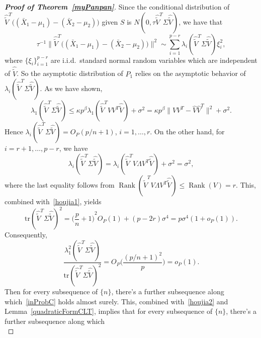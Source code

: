 \documentclass[review]{elsarticle}
\DeclareMathOperator{\myrank}{Rank}
\theoremstyle{plain}
\theoremstyle{definition}
\theoremstyle{remark}
\begin{document}
\begin{proof}[\textbf{Proof of Theorem~\ref{myPanpan}}]
    Since the conditional distribution of
    $\hat{\tilde{V}}^T\big((\bar{X}_1-\mu_1)-(\bar{X}_2-\mu_2)\big)$ given $S$ is $N(0,\tau \hat{\tilde{V}}^T\Sigma\hat{\tilde{V}})$,
    we have that
\begin{equation}\label{houjia2}
\tau^{-1}\big\|\hat{\tilde{V}}^T\big((\bar{X}_1-\mu_1)-(\bar{X}_2-\mu_2)\big)\big\|^2
\sim
    \sum_{i=1}^{p-r} \lambda_i(\hat{\tilde{V}}^T\Sigma\hat{\tilde{V}})\xi_i^2,
\end{equation}
where $\{\xi_i\}_{i=1}^{p-r}$ are i.i.d.\  standard normal random variables which are independent of $\hat{\tilde{V}}$.
    So the asymptotic distribution of $P_1$ relies on the asymptotic behavior of $\lambda_i(\hat{\tilde{V}}^T\Sigma\hat{\tilde{V}})$.
    As we have shown,
     \begin{equation}\label{houjia1}
     \lambda_1(\hat{\tilde{V}}^T\Sigma\hat{\tilde{V}})\leq 
     \kappa p^{\beta}\lambda_1(\hat{\tilde{V}}^T V V^T\hat{\tilde{V}})+\sigma^2
     =
    \kappa p^\beta \|VV^T -\hat{V}\hat{V}^T\|^2+\sigma^2.
     \end{equation}
    Hence $\lambda_i(\hat{\tilde{V}}^T\Sigma\hat{\tilde{V}})=O_P({p}/{n}+1)$, $i=1,\ldots,r$.
    On the other hand,
    for $i=r+1,\ldots,p-r$,
    we have
    \begin{equation}\label{houjia3}
    \lambda_i(\hat{\tilde{V}}^T\Sigma\hat{\tilde{V}})
    =
    \lambda_i(\hat{\tilde{V}}^T V \Lambda V^T \hat{\tilde{V}})+\sigma^2
    =\sigma^2,
    \end{equation}
where the last equality follows from $\myrank(\hat{\tilde{V}}^T V \Lambda V^T \hat{\tilde{V}})\leq \myrank(V)=r$.
This, combined with~\eqref{houjia1}, yields
\begin{equation}\label{traceA1}
\mathrm{tr}(\hat{\tilde{V}}^T\Sigma\hat{\tilde{V}})^2=
    {\big(\frac{p}{n}+1\big)}^2O_P(1)
    +
    (p-2r)\sigma^4
    =p\sigma^4(1+o_P(1)).
\end{equation}
Consequently,
\begin{equation}\label{inProbC}
        \frac{\lambda_1^2(\hat{\tilde{V}}^T\Sigma\hat{\tilde{V}})}{\mathrm{tr}(\hat{\tilde{V}}^T\Sigma\hat{\tilde{V}})^2}
        =O_P\Big(\frac{{(p/n+1)}^2}{p}\Big)=o_P(1).
\end{equation}
Then for every subsequence of $\{n\}$, there's a further subsequence along which~\eqref{inProbC} holds almost surely.
This, combined with~\eqref{houjia2} and Lemma~\ref{quadraticFormCLT}, implies that for every subsequence of $\{n\}$, there's a further subsequence along which
\begin{equation}\label{aseq}

\end{equation}
\end{proof}
\end{document}
